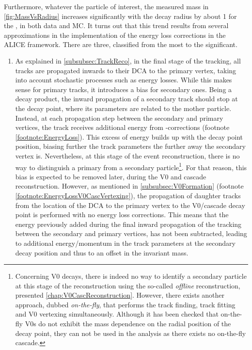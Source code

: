 Furthermore, whatever the particle of interest, the measured mass in \fig\ref{fig:MassVsRadius} increases significantly with the decay radius by about 1 \mmass for the \rmXi, in both data and MC. It turns out that this trend results from several approximations in the implementation of the energy loss corrections in the ALICE framework. There are three, classified from the most to the  significant.

\begin{enumerate}
\item As explained in \Sec\ref{subsubsec:TrackReco}, in the final stage of the tracking, all tracks are propagated inwards to their DCA to the primary vertex, taking into account stochastic processes such as energy losses. While this makes sense for primary tracks, it introduces a bias for secondary ones. Being a decay product, the inward propagation of a secondary track should stop at the decay point, where its parameters are related to the mother particle. Instead, at each propagation step between the secondary and primary vertices, the track receives additional energy from \dEdx-corrections (footnote \ref{footnote:EnergyLoss}). This excess of energy builds up with the decay point position, biasing further the track parameters the further away the secondary vertex is. Nevertheless, at this stage of the event reconstruction, there is no way to distinguish a primary from a secondary particle\footnote{Concerning V0 decays, there is indeed no way to identify a secondary particle at this stage of the reconstruction using the so-called \textit{offline} reconstruction, presented \chap\ref{chap:V0CascReconstruction}. However, there exists another approach, dubbed \textit{on-the-fly}, that performs the track finding, track fitting and V0 vertexing simultaneously. Although it has been checked that on-the-fly V0s do not exhibit the mass dependence on the radial position of the decay point, they can not be used in the analysis as there exists no on-the-fly cascade.}. For that reason, this bias is expected to be removed later, during the V0 and cascade reconstruction. However, as mentioned in \Sec\ref{subsubsec:V0Formation} (footnote \ref{footnote:EnergyLossV0CascVertexing}), the propagation of daughter tracks from the location of the DCA to the primary vertex to the V0/cascade decay point is performed with no energy loss corrections. This means that the energy previously added during the final inward propagation of the tracking between the secondary and primary vertices, has not been subtracted, leading to additional energy/momentum in the track parameters at the
secondary decay position and thus to an offset in the invariant mass.


\end{enumerate}
